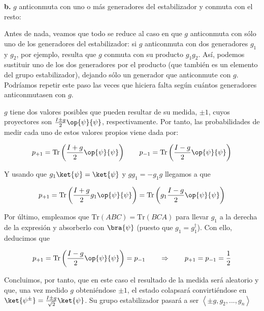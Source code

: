 \documentclass[11pt,a4paper,twoside,pdf]{article}
\numberwithin{equation}{section}
\begin{document}
			\begin{flushleft}\textbf{b.} $g$ anticonmuta con uno o más generadores del estabilizador y conmuta con el resto:	\end{flushleft} 
			
			Antes de nada, veamos que todo se reduce al caso en que $g$ anticonmuta con sólo uno de los generadores del estabilizador: si $g$ anticonmuta con dos generadores $g_1$ y $g_2$, por ejemplo, resulta que $g$ conmuta con su producto $g_1g_2$. Así, podemos sustituir uno de los dos generadores por el producto (que también es un elemento del grupo estabilizador), dejando sólo un generador que anticonmute con $g$. Podríamos repetir este paso las veces que hiciera falta según cuántos generadores anticonmutasen con $g$.
			
			$g$ tiene dos valores posibles que pueden resultar de su medida, $\pm1$, cuyos proyectores son $\frac{I\pm g}{2}\op{\psi}{\psi}$, respectivamente. Por tanto, las probabilidades de medir cada uno de estos valores propios viene dada por:
			 	
			 	\begin{equation}
			 		p_{+1} = \text{Tr} \left( \frac{I+g}{2}\op{\psi}{\psi} \right) 	\qquad		p_{-1}=\text{Tr} \left( \frac{I-g}{2}\op{\psi}{\psi} \right) 
			 	\end{equation}
			 
			 Y usando que $g_1\ket{\psi}=\ket{\psi}$ y $gg_1=-g_1g$ llegamos a que 
			 
			 	\begin{equation}
					p_{+1} = \text{Tr} \left( \frac{I+g}{2}g_1\op{\psi}{\psi} \right) = \text{Tr} \left( g_1 \frac{I-g}{2}\op{\psi}{\psi} \right)
				\end{equation}			 	
		
			Por último, empleamos que $\text{Tr}(ABC)=\text{Tr}(BCA)$ para llevar $g_1$ a la derecha de la expresión y absorberlo con $\bra{\psi}$ (puesto que $g_1=g_1^{\dagger}$). Con ello, deducimos que
			
				\begin{equation}
					p_{+1} = \text{Tr} \left( \frac{I-g}{2}\op{\psi}{\psi} \right) = p_{-1} 	\qquad		\Rightarrow		\qquad		p_{+1}=p_{-1}=\frac{1}{2}
				\end{equation}
	
			Concluimos, por tanto, que en este caso el resultado de la medida será aleatorio y que, una vez medido $g$ obteniéndose $\pm1$, el estado colapsará convirtiéndose en $\ket{\psi^{\pm}}=\frac{I\pm g}{\sqrt{2}}\ket{\psi}$. Su grupo estabilizador pasará a ser $\left\langle \pm g, g_2,...,g_n \right\rangle $
	
\end{document}
